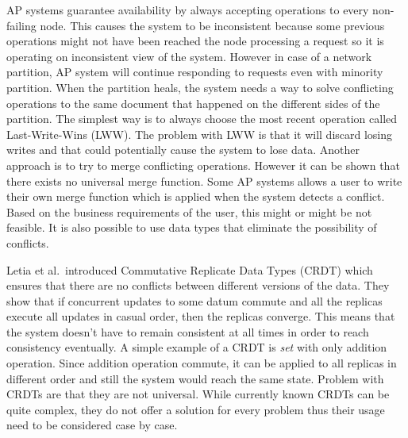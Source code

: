 AP systems guarantee availability by always accepting operations to every
non-failing node. This causes the system to be inconsistent because some
previous operations might not have been reached the node processing a request so
it is operating on inconsistent view of the system. However in case of a network
partition, AP system will continue responding to requests even with minority
partition. When the partition heals, the system needs a way to solve conflicting
operations to the same document that happened on the different sides of the
partition. The simplest way is
to always choose the most recent operation called Last-Write-Wins (LWW). The
problem with LWW is that it will discard losing writes and that could
potentially cause the system to lose data. Another approach is to try to merge
conflicting operations. However it can be shown that there exists no universal
merge function. Some AP systems allows a user to write
their own merge function which is applied when the system detects a conflict.
Based on the business requirements of the user, this might or might be not
feasible. It is also possible to use data types that eliminate the possibility
of conflicts.

Letia et al.\ introduced Commutative Replicate Data Types
(CRDT)\cite{letia2009crdts} which ensures that there are no conflicts between
different versions of the data. They show that if concurrent updates to some
datum commute and all the replicas execute all updates in casual order, then the
replicas converge. This means that the system doesn't have to remain consistent
at all times in order to reach consistency eventually. A simple example of a
CRDT is \emph{set} with only addition operation. Since addition operation
commute, it can be applied to all replicas in different order and still the
system would reach the same state. Problem with CRDTs are that they are not
universal. While currently known CRDTs can be quite complex, they do not offer a
solution for every problem thus their usage need to be considered case by case.

